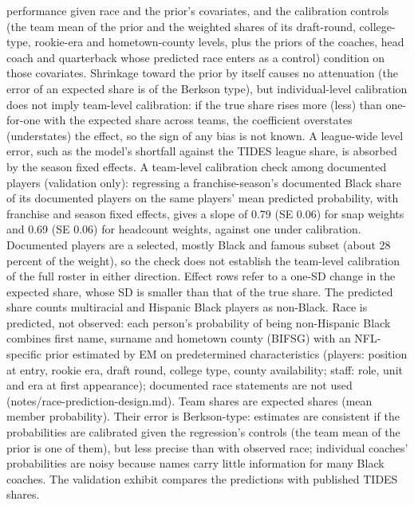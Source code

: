 \begin{table}[!h]
{\begin{threeparttable}
\begin{tablenotes}[para]
performance given race and the prior's covariates, and the calibration controls (the team mean of the prior and the weighted shares of its draft-round, college-type, rookie-era and hometown-county levels, plus the priors of the coaches, head coach and quarterback whose predicted race enters as a control) condition on those covariates. Shrinkage toward the prior by itself causes no attenuation (the error of an expected share is of the Berkson type), but individual-level calibration does not imply team-level calibration: if the true share rises more (less) than one-for-one with the expected share across teams, the coefficient overstates (understates) the effect, so the sign of any bias is not known. A league-wide level error, such as the model's shortfall against the TIDES league share, is absorbed by the season fixed effects. A team-level calibration check among documented players (validation only): regressing a franchise-season's documented Black share of its documented players on the same players' mean predicted probability, with franchise and season fixed effects, gives a slope of 0.79 (SE 0.06) for snap weights and  0.69 (SE 0.06) for headcount weights, against one under calibration. Documented players are a selected, mostly Black and famous subset (about 28 percent of the weight), so the check does not establish the team-level calibration of the full roster in either direction. Effect rows refer to a one-SD change in the expected share, whose SD is smaller than that of the true share. The predicted share counts multiracial and Hispanic Black players as non-Black. Race is predicted, not observed: each person's probability of being non-Hispanic Black combines first name, surname and hometown county (BIFSG) with an NFL-specific prior estimated by EM on predetermined characteristics (players: position at entry, rookie era, draft round, college type, county availability; staff: role, unit and era at first appearance); documented race statements are not used (notes/race-prediction-design.md). Team shares are expected shares (mean member probability). Their error is Berkson-type: estimates are consistent if the probabilities are calibrated given the regression's controls (the team mean of the prior is one of them), but less precise than with observed race; individual coaches' probabilities are noisy because names carry little information for many Black coaches. The validation exhibit compares the predictions with published TIDES shares.
\end{tablenotes}
\end{threeparttable}}
\end{table}
